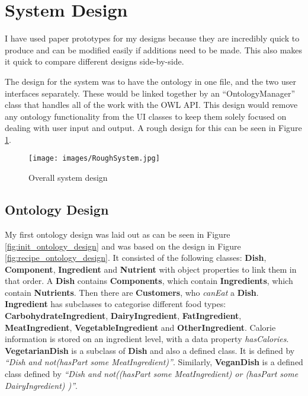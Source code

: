 \section{System Design}

I have used paper prototypes \cite{snyder2003paper} for my designs because they are incredibly quick to produce and can be modified easily if additions need to be made. This also makes it quick to compare different designs side-by-side.

The design for the system was to have the ontology in one file, and the two user interfaces separately. These would be linked together by an ``OntologyManager'' class that handles all of the work with the OWL API. This design would remove any ontology functionality from the UI classes to keep them solely focused on dealing with user input and output. A rough design for this can be seen in Figure \ref{fig:overall_system_design}.

\begin{figure}[h]
    \centering
    \captionsetup{justification=centering}
    \texttt{[image: images/RoughSystem.jpg]}
    \caption{Overall system design}
    \label{fig:overall_system_design}
\end{figure}

\subsection{Ontology Design}

My first ontology design was laid out as can be seen in Figure \ref{fig:init_ontology_design} and was based on the design in Figure \ref{fig:recipe_ontology_design}. It consisted of the following classes: \textbf{Dish}, \textbf{Component}, \textbf{Ingredient} and \textbf{Nutrient} with object properties to link them in that order. A \textbf{Dish} contains \textbf{Components}, which contain \textbf{Ingredients}, which contain \textbf{Nutrients}. Then there are \textbf{Customers}, who \textit{canEat} a \textbf{Dish}. \textbf{Ingredient} has subclasses to categorise different food types: \textbf{CarbohydrateIngredient}, \textbf{DairyIngredient}, \textbf{FatIngredient}, \textbf{MeatIngredient}, \textbf{VegetableIngredient} and \textbf{OtherIngredient}. Calorie information is stored on an ingredient level, with a data property \textit{hasCalories}. \textbf{VegetarianDish} is a subclass of \textbf{Dish} and also a defined class. It is defined by \textit{ ``Dish and not(hasPart some MeatIngredient)''}. Similarly, \textbf{VeganDish} is a defined class defined by \textit{ ``Dish and not((hasPart some MeatIngredient) or (hasPart some DairyIngredient) )''}.

